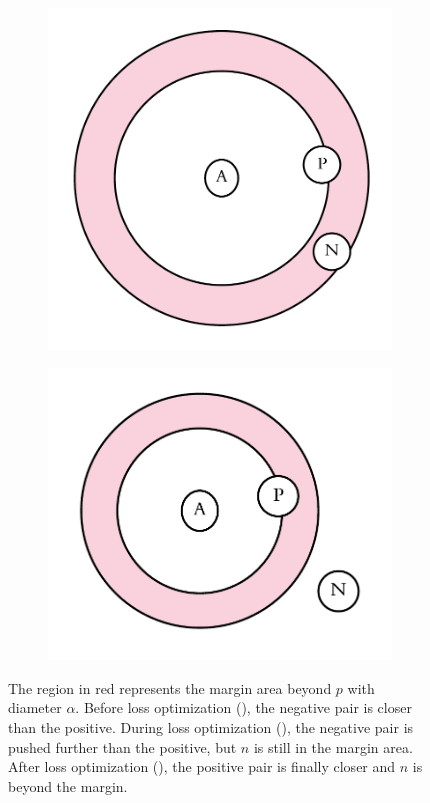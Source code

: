 \begin{figure}[ht]
\begin{subfigure}[t]{0.25\textwidth}
		\includegraphics[width=\linewidth]{imgs/triplet_loss_during.pdf}
		\subcaption{}\label{fig:triplet:b}
	\end{subfigure}%
	\hspace{1cm}%
	\begin{subfigure}[t]{0.25\textwidth}
		\includegraphics[width=\linewidth]{imgs/triplet_loss_after.pdf}
		\subcaption{}\label{fig:triplet:c}
	\end{subfigure}%
	\caption{The region in red represents the margin area beyond $p$ with diameter $\alpha$. Before loss optimization (), the negative pair is closer than the positive. During loss optimization (), the negative pair is pushed further than the positive, but $n$ is still in the margin area. After loss optimization (), the positive pair is finally closer and $n$ is beyond the margin.}
	\label{fig:triplet}
\end{figure}

